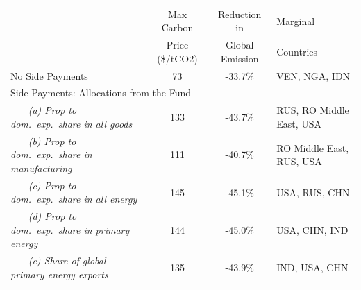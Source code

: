 \begin{center}
\small
\setlength{\tabcolsep}{4pt}
\renewcommand{\arraystretch}{1.25}
\begin{tabular}{l cc l}
\hline
 & Max Carbon & Reduction in  & Marginal \\
 & Price (\$/tCO2) & Global Emission & Countries \\
\hline
 No Side Payments & 73 & -33.7\% & VEN, NGA, IDN \\
\multicolumn{4}{l}{Side Payments: Allocations from the Fund} \\
 ~~~ \textit{(a) Prop to dom.\ exp.\ share in all goods} & 133 & -43.7\% & RUS, RO Middle East, USA \\
 ~~~ \textit{(b) Prop to dom.\ exp.\ share in manufacturing} & 111 & -40.7\% & RO Middle East, RUS, USA \\
 ~~~ \textit{(c) Prop to dom.\ exp.\ share in all energy} & 145 & -45.1\% & USA, RUS, CHN \\
 ~~~ \textit{(d) Prop to dom.\ exp.\ share in primary energy} & 144 & -45.0\% & USA, CHN, IND \\
 ~~~ \textit{(e) Share of global primary energy exports} & 135 & -43.9\% & IND, USA, CHN \\
\hline
\end{tabular}
\end{center}
